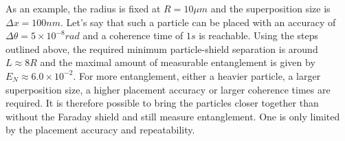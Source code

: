As an example, the radius is fixed at $R=10\si{\mu m}$ and the superposition size is $\Delta x = 100\si{nm}$. Let's say that such a particle can be placed with an accuracy of $\Delta \theta = 5 \times 10^{-8} \si{rad}$ and a coherence time of $1\si{s}$ is reachable. 
Using the steps outlined above, the required minimum particle-shield separation is around $L\approx 8R$ and the maximal amount of measurable entanglement is given by $E_N \approx 6.0\times 10^{-2}$.
For more entanglement, either a heavier particle, a larger superposition size, a higher placement accuracy or larger coherence times are required. 
It is therefore possible to bring the particles closer together than without the Faraday shield and still measure entanglement.
One is only limited by the placement accuracy and repeatability.